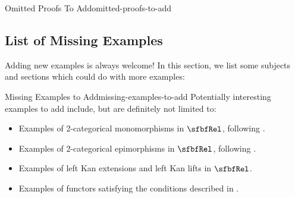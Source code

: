 \begin{remark}{Omitted Proofs To Add}{omitted-proofs-to-add}
\begin{itemize}
    \end{itemize}
\end{remark}
\subsection{List of Missing Examples}\label{subsection-list-of-missing-examples}
Adding new examples is always welcome! In this section, we list some subjects and sections which could do with more examples:
\begin{remark}{Missing Examples to Add}{missing-examples-to-add}%
    Potentially interesting examples to add include, but are definitely not limited to:
    \begin{itemize}
        \item Examples of 2-categorical monomorphisms in $\sfbfRel$, following .
        \item Examples of 2-categorical epimorphisms in $\sfbfRel$, following .
        \item Examples of left Kan extensions and left Kan lifts in $\sfbfRel$.
        \item Examples of functors satisfying the conditions described in \ChapterCategories.
    \end{itemize}
\end{remark}
